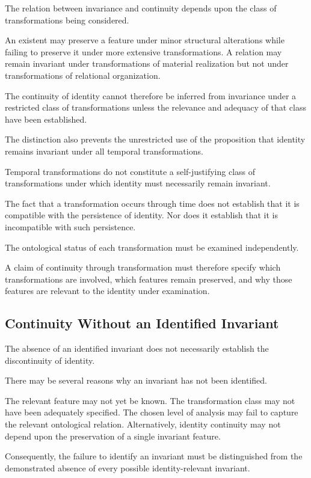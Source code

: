 The relation between invariance and continuity depends
upon the class of transformations being considered.

An existent may preserve a feature under minor structural
alterations while failing to preserve it under more
extensive transformations. A relation may remain
invariant under transformations of material realization
but not under transformations of relational organization.

The continuity of identity cannot therefore be inferred
from invariance under a restricted class of transformations
unless the relevance and adequacy of that class have
been established.

The distinction also prevents the unrestricted use
of the proposition that identity remains invariant
under all temporal transformations.

Temporal transformations do not constitute a
self-justifying class of transformations under which
identity must necessarily remain invariant.

The fact that a transformation occurs through time
does not establish that it is compatible with the
persistence of identity. Nor does it establish that
it is incompatible with such persistence.

The ontological status of each transformation must
be examined independently.

A claim of continuity through transformation must
therefore specify which transformations are involved,
which features remain preserved, and why those features
are relevant to the identity under examination.

\subsection{Continuity Without an Identified Invariant}

The absence of an identified invariant does not
necessarily establish the discontinuity of identity.

There may be several reasons why an invariant has
not been identified.

The relevant feature may not yet be known. The
transformation class may not have been adequately
specified. The chosen level of analysis may fail
to capture the relevant ontological relation.
Alternatively, identity continuity may not depend
upon the preservation of a single invariant feature.

Consequently, the failure to identify an invariant
must be distinguished from the demonstrated absence
of every possible identity-relevant invariant.

